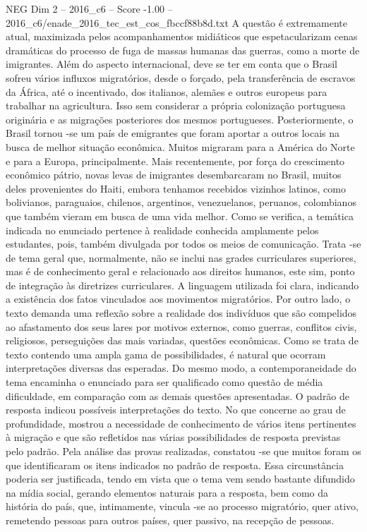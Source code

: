 \begin{textsample}{NEG Dim 2 – 2016\_c6 – Score -1.00 – 2016\_c6/enade\_2016\_tec\_est\_cos\_fbccf88b8d.txt}
A questão é extremamente atual, maximizada pelos acompanhamentos midiáticos que espetacularizam cenas dramáticas do processo de fuga de massas humanas das guerras, como a morte de imigrantes.
Além do aspecto internacional, deve se ter em conta que o Brasil sofreu vários influxos migratórios, desde o forçado, pela transferência de escravos da África, até o incentivado, dos italianos, alemães e outros europeus para trabalhar na agricultura.
Isso sem considerar a própria colonização portuguesa originária e as migrações posteriores dos mesmos portugueses.
Posteriormente, o Brasil tornou -se um país de emigrantes que foram aportar a outros locais na busca de melhor situação econômica.
Muitos migraram para a América do Norte e para a Europa, principalmente.
Mais recentemente, por força do crescimento econômico pátrio, novas levas de imigrantes desembarcaram no Brasil, muitos deles provenientes do Haiti, embora tenhamos recebidos vizinhos latinos, como bolivianos, paraguaios, chilenos, argentinos, venezuelanos, peruanos, colombianos que também vieram em busca de uma vida melhor.
Como se verifica, a temática indicada no enunciado pertence à realidade conhecida amplamente pelos estudantes, pois, também divulgada por todos os meios de comunicação.
Trata -se de tema geral que, normalmente, não se inclui nas grades curriculares superiores, mas é de conhecimento geral e relacionado aos direitos humanos, este sim, ponto de integração às diretrizes curriculares.
A linguagem utilizada foi clara, indicando a existência dos fatos vinculados aos movimentos migratórios.
Por outro lado, o texto demanda uma reflexão sobre a realidade dos indivíduos que são compelidos ao afastamento dos seus lares por motivos externos, como guerras, conflitos civis, religiosos, perseguições das mais variadas, questões econômicas.
Como se trata de texto contendo uma ampla gama de possibilidades, é natural que ocorram interpretações diversas das esperadas.
Do mesmo modo, a contemporaneidade do tema encaminha o enunciado para ser qualificado como questão de média dificuldade, em comparação com as demais questões apresentadas.
O padrão de resposta indicou possíveis interpretações do texto.
No que concerne ao grau de profundidade, mostrou a necessidade de conhecimento de vários itens pertinentes à migração e que são refletidos nas várias possibilidades de resposta previstas pelo padrão.
Pela análise das provas realizadas, constatou -se que muitos foram os que identificaram os itens indicados no padrão de resposta.
Essa circunstância poderia ser justificada, tendo em vista que o tema vem sendo bastante difundido na mídia social, gerando elementos naturais para a resposta, bem como da história do país, que, intimamente, vincula -se ao processo migratório, quer ativo, remetendo pessoas para outros países, quer passivo, na recepção de pessoas.

\end{textsample}
